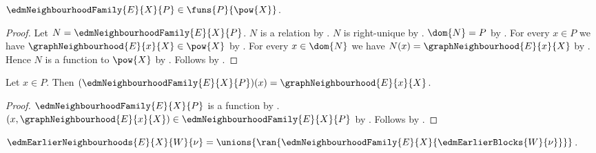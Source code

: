 \begin{theorem}\label{edm_neighbourhood_family_type}
    $\edmNeighbourhoodFamily{E}{X}{P}\in\funs{P}{\pow{X}}$.
\end{theorem}
\begin{proof}
    Let $N=\edmNeighbourhoodFamily{E}{X}{P}$.
    $N$ is a relation by
        .
    $N$ is right-unique by
        .
    $\dom{N}=P$ by
        .
    For every $x\in P$ we have
        $\graphNeighbourhood{E}{x}{X}\in\pow{X}$ by
        .
    For every $x\in\dom{N}$ we have
        $N(x)=\graphNeighbourhood{E}{x}{X}$ by
        .
    Hence $N$ is a function to $\pow{X}$ by \auto.
    Follows by .
\end{proof}

\begin{proposition}\label{edm_neighbourhood_family_apply}
    Let $x\in P$.
    Then $(\edmNeighbourhoodFamily{E}{X}{P})(x)
        =\graphNeighbourhood{E}{x}{X}$.
\end{proposition}
\begin{proof}
    $\edmNeighbourhoodFamily{E}{X}{P}$ is a function by
        .
    $(x,\graphNeighbourhood{E}{x}{X})
        \in\edmNeighbourhoodFamily{E}{X}{P}$ by
        .
    Follows by .
\end{proof}

\begin{definition}\label{edm_earlier_neighbourhoods}
    $\edmEarlierNeighbourhoods{E}{X}{W}{\nu}
        =\unions{\ran{\edmNeighbourhoodFamily{E}{X}
            {\edmEarlierBlocks{W}{\nu}}}}$.
\end{definition}

